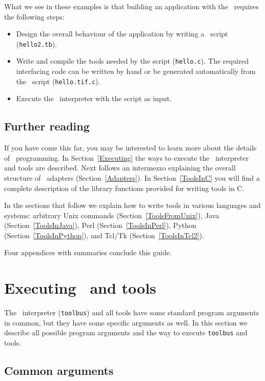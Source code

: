 \documentclass[twoside]{article} %
\begin{document}
What we see in these examples is that
building an application with the \TB\ requires the following steps:
\begin{itemize}
\item Design the overall behaviour of the application by writing a \T\ script ({\tt hello2.tb}).
\item Write and compile the tools needed by the script ({\tt hello.c}).
The required interfacing code can be written by hand or be generated
automatically from the \T\ script ({\tt hello.tif.c}).
\item Execute the \TB\ interpreter with the script as input.
\end{itemize}

\subsection{Further reading}
If you have come this far, you may be interested to learn more about the details
of \TB\ programming.
In Section~\ref{Executing} the ways to execute the \TB\ interpreter
and tools are described.
Next follows an intermezzo explaining the overall structure of \TB\ adapters
(Section~\ref{Adapters}).
In Section~\ref{ToolsInC} you will find a complete description
of the library functions provided for writing tools in C.

In the sections that follow we explain how to write tools in various languages
and systems:
arbitrary Unix commands (Section~\ref{ToolsFromUnix}),
Java (Section~\ref{ToolsInJava}),
Perl (Section~\ref{ToolsInPerl}),
Python (Section~\ref{ToolsInPython}), and
Tcl/Tk (Section~\ref{ToolsInTcl2}).

Four appendices with summaries conclude this guide.

\section{\label{Executing}Executing \TB\ and tools}

The \TB\ interpreter ({\tt toolbus}) and all tools have some
standard program arguments in common, but they have some specific
arguments as well. In this section we describe all possible program arguments
and the way to execute {\tt toolbus} and tools.

\subsection{Common arguments}
\end{document}
